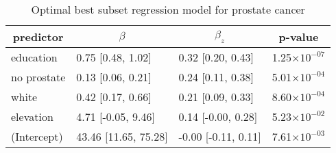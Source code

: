 %
\begin{table}[!tbp]
\caption{Optimal best subset regression model for prostate cancer\label{SI_tab:prostate}} 
\begin{center}
\begin{tabular}{llll}
\hline\hline
\multicolumn{1}{c}{predictor}&\multicolumn{1}{c}{$\beta$}&\multicolumn{1}{c}{$\beta_z$}&\multicolumn{1}{c}{p-value}\tabularnewline
\hline
education&0.75 [0.48, 1.02]&0.32 [0.20, 0.43]&1.25$\times10^{-07}$\tabularnewline
no prostate&0.13 [0.06, 0.21]&0.24 [0.11, 0.38]&5.01$\times10^{-04}$\tabularnewline
white&0.42 [0.17, 0.66]&0.21 [0.09, 0.33]&8.60$\times10^{-04}$\tabularnewline
elevation&4.71 [-0.05, 9.46]&0.14 [-0.00, 0.28]&5.23$\times10^{-02}$\tabularnewline
(Intercept)&43.46 [11.65, 75.28]&-0.00 [-0.11, 0.11]&7.61$\times10^{-03}$\tabularnewline
\hline
\end{tabular}
\end{center}
\end{table}

